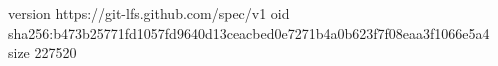 version https://git-lfs.github.com/spec/v1
oid sha256:b473b25771fd1057fd9640d13ceacbed0e7271b4a0b623f7f08eaa3f1066e5a4
size 227520
